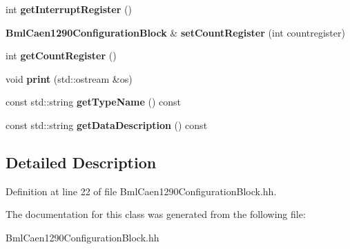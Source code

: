 \begin{DoxyCompactItemize}
\item 
int {\bfseries getInterruptRegister} ()\label{classCALICE_1_1BmlCaen1290ConfigurationBlock_aaee03cf540e2494f17dc7837f32137d0}

\item 
{\bf BmlCaen1290ConfigurationBlock} \& {\bfseries setCountRegister} (int countregister)\label{classCALICE_1_1BmlCaen1290ConfigurationBlock_a457aedeb41da454148865f66f82c1ba4}

\item 
int {\bfseries getCountRegister} ()\label{classCALICE_1_1BmlCaen1290ConfigurationBlock_a0c3d644ba875e29f3ce31fb0da51941f}

\item 
void {\bfseries print} (std::ostream \&os)\label{classCALICE_1_1BmlCaen1290ConfigurationBlock_adbb29adf8d9fd7ecd6e7176ac4348e13}

\item 
const std::string {\bfseries getTypeName} () const \label{classCALICE_1_1BmlCaen1290ConfigurationBlock_a1c568fad015045482af859b6432b1838}

\item 
const std::string {\bfseries getDataDescription} () const \label{classCALICE_1_1BmlCaen1290ConfigurationBlock_a20a49557bcb139b1047748ce0cbd809a}

\end{DoxyCompactItemize}


\subsection{Detailed Description}


Definition at line 22 of file BmlCaen1290ConfigurationBlock.hh.

The documentation for this class was generated from the following file:\begin{DoxyCompactItemize}
\item 
BmlCaen1290ConfigurationBlock.hh\end{DoxyCompactItemize}

